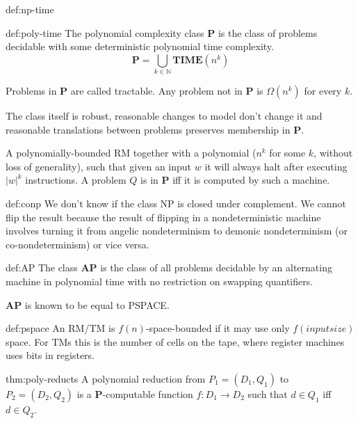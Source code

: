 \documentclass[landscape, 8pt]{extarticle}
\begin{document}
\begin{multicols}{3}
\begin{dfn}{def:np-time}{}
\end{dfn}


\begin{dfn}{def:poly-time}{}
The polynomial complexity class \textbf{P} is the class of problems decidable with some deterministic polynomial time complexity.
\[\textbf{P} = \bigcup_{k \in \mathbb{N}} \textbf{TIME}(n^k)\]

Problems in \textbf{P} are called tractable. Any problem not in \textbf{P} is $\Omega(n^k)$ for every $k$.

The class itself is robust, reasonable changes to model don't change it and reasonable translations between problems preserves membership in \textbf{P}.

A polynomially-bounded RM together with a polynomial ($n^k$ for some $k$, without loss of generality), such that given an input $w$ it will always halt after executing $|w|^k$ instructions. A problem $Q$ is in \textbf{P} iff it is computed by such a machine.
\end{dfn}


\begin{dfn}[CoNP]{def:conp}{}
We don't know if the class NP is closed under complement. We cannot flip the result because the result of flipping in a nondeterministic machine involves turning it from angelic nondeterminism to demonic nondeterminism (or co-nondeterminism) or vice versa.
\end{dfn}

\begin{dfn}{def:AP}{}
The class \textbf{AP} is the class of all problems decidable by an alternating machine in polynomial time with no restriction on swapping quantifiers.

\textbf{AP} is known to be equal to PSPACE.
\end{dfn}

\begin{dfn}{def:pspace}{}
An RM/TM is $f(n)$-space-bounded if it may use only $f(inputsize)$ space. For TMs this is the number of cells on the tape, where register machines uses bits in registers.

\end{dfn}

\begin{thm}{thm:poly-reducts}{}
A polynomial reduction from $P_1 = (D_1, Q_1)$ to $P_2 = (D_2, Q_2)$ is a \textbf{P}-computable function $f : D_1 \to D_2$ such that $d \in Q_1$ iff $d \in Q_2$.


\end{thm}
\end{multicols}
\end{document}
